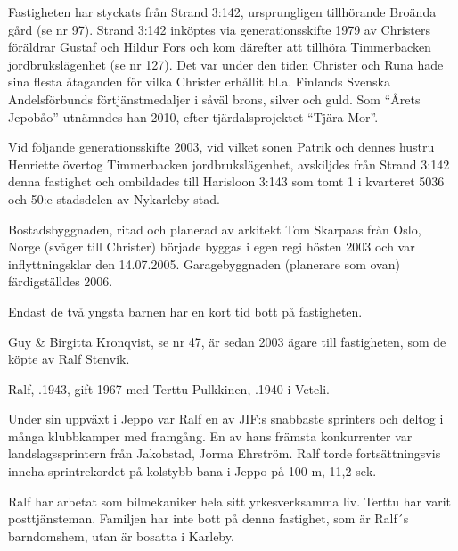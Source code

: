 
Fastigheten har styckats från Strand 3:142, ursprungligen tillhörande Broända gård (se nr 97). Strand 3:142 inköptes via generationsskifte 1979 av Christers föräldrar Gustaf och Hildur Fors och kom därefter att tillhöra Timmerbacken jordbrukslägenhet (se nr 127). Det var under den tiden Christer och Runa hade sina flesta åtaganden för vilka Christer erhållit bl.a. Finlands Svenska Andelsförbunds förtjänstmedaljer i såväl brons, silver och guld. Som ``Årets Jepobåo'' utnämndes han 2010, efter tjärdalsprojektet ``Tjära Mor''.

Vid följande generationsskifte 2003, vid vilket sonen Patrik och dennes hustru Henriette övertog Timmerbacken jordbrukslägenhet, avskiljdes från Strand 3:142 denna fastighet och ombildades till	Harisloon 3:143 som tomt 1 i kvarteret 5036 och 50:e stadsdelen av	Nykarleby stad.

Bostadsbyggnaden, ritad och planerad av arkitekt Tom Skarpaas	från Oslo, Norge (svåger till Christer) började byggas i egen regi hösten 2003 och var inflyttningsklar den 14.07.2005. Garagebyggnaden (planerare som ovan) färdigställdes 2006.

Endast de två yngsta barnen har en kort tid bott på fastigheten.



Guy \& Birgitta Kronqvist, se nr 47, är sedan 2003 ägare till fastigheten, som de köpte av Ralf Stenvik.




Ralf, .1943, gift 1967 med Terttu Pulkkinen, .1940 i Veteli.
\begin{jhchildren}
  \item {}
  \item {}
\end{jhchildren}

Under sin uppväxt i Jeppo var Ralf en av JIF:s snabbaste sprinters och deltog i många klubbkamper med framgång. En av hans främsta konkurrenter var landslagssprintern från Jakobstad, Jorma Ehrström. Ralf torde fortsättningsvis inneha sprintrekordet på kolstybb-bana i Jeppo på 100 m, 11,2 sek.

Ralf har arbetat som bilmekaniker hela sitt yrkesverksamma liv. Terttu har varit posttjänsteman. Familjen har inte bott på denna fastighet, som är Ralf´s barndomshem, utan är bosatta i Karleby.


